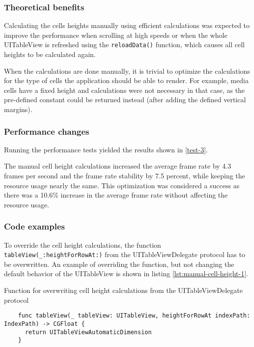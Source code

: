 \documentclass[a4paper,12pt]{article}
\begin{document}
\subsubsection{Theoretical benefits}
Calculating the cells heights manually using efficient calculations was expected to improve the performance when scrolling at high speeds or when the whole UITableView is refreshed using the \texttt{reloadData()} function, which causes all cell heights to be calculated again\cite{ReloadDataHeights}.

When the calculations are done manually, it is trivial to optimize the calculations for the type of cells the application should be able to render. For example, media cells have a fixed height and calculations were not necessary in that case, as the pre-defined constant could be returned instead (after adding the defined vertical margins).

\subsubsection{Performance changes}
Running the performance tests yielded the results shown in \autoref{test-3}.

The manual cell height calculations increased the average frame rate by 4.3 frames per second and the frame rate stability by 7.5 percent, while keeping the resource usage nearly the same. This optimization was considered a success as there was a 10.6\% increase in the average frame rate without affecting the resource usage. 

\subsubsection{Code examples}
To override the cell height calculations, the function \texttt{tableView(_:heightForRowAt:)} from the UITableViewDelegate protocol has to be overwritten. An example of overriding the function, but not changing the default behavior of the UITableView is shown in listing \autoref{lst:manual-cell-height-1}.
\begin{listing}[H]
  \caption{Function for overwriting cell height calculations from the UITableViewDelegate protocol}
  \label{lst:manual-cell-height-1}
  \begin{verbatim}
    func tableView(_ tableView: UITableView, heightForRowAt indexPath: IndexPath) -> CGFloat {
      return UITableViewAutomaticDimension
    }
  \end{verbatim}
\end{listing}
\end{document}
